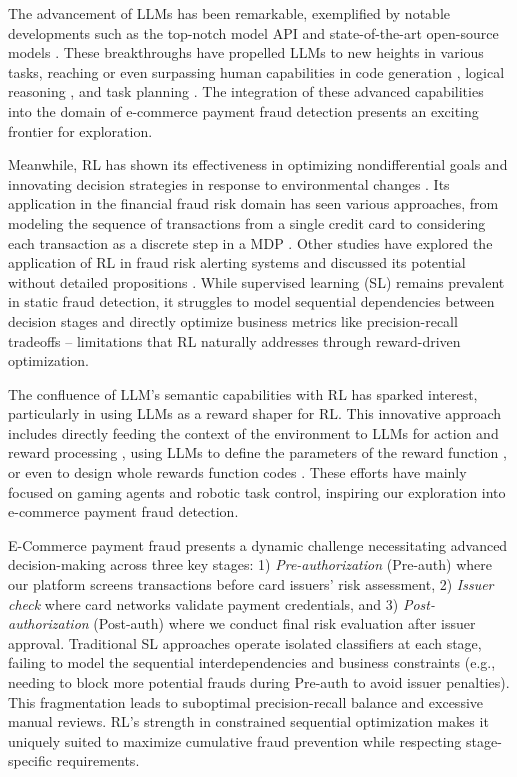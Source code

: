 \documentclass[11pt]{article}
\begin{document}
The advancement of LLMs has been remarkable, exemplified by notable developments such as the top-notch model API \cite{openai2023gpt} and state-of-the-art open-source models \cite{dubey2024llama3herdmodels} \cite{jiang2023mistral} \cite{jiang2024mixtral} \cite{team2024gemma} \cite{guo2024deepseek}. These breakthroughs have propelled LLMs to new heights in various tasks, reaching or even surpassing human capabilities in code generation \cite{chen2021evaluating}, logical reasoning \cite{kojima2022large}, and task planning \cite{shen2024hugginggpt}. The integration of these advanced capabilities into the domain of e-commerce payment fraud detection presents an exciting frontier for exploration.

Meanwhile, RL has shown its effectiveness in optimizing nondifferential goals and innovating decision strategies in response to environmental changes \cite{sutton2018reinforcement} \cite{russell2010artificial}. Its application in the financial fraud risk domain has seen various approaches, from modeling the sequence of transactions from a single credit card to considering each transaction as a discrete step in a MDP \cite{mead2018detecting} \cite{vimal2021application}. Other studies have explored the application of RL in fraud risk alerting systems \cite{shen2020deep} and discussed its potential without detailed propositions \cite{el2017fraud}. While supervised learning (SL) remains prevalent in static fraud detection, it struggles to model sequential dependencies between decision stages and directly optimize business metrics like precision-recall tradeoffs – limitations that RL naturally addresses through reward-driven optimization.

The confluence of LLM’s semantic capabilities with RL has sparked interest, particularly in using LLMs as a reward shaper for RL. This innovative approach includes directly feeding the context of the environment to LLMs for action and reward processing \cite{kwon2023reward}, using LLMs to define the parameters of the reward function \cite{yu2023language}, or even to design whole rewards function codes \cite{ma2023eureka}. These efforts have mainly focused on gaming agents and robotic task control, inspiring our exploration into e-commerce payment fraud detection.

E-Commerce payment fraud presents a dynamic challenge necessitating advanced decision-making across three key stages: 1) \textit{Pre-authorization} (Pre-auth) where our platform screens transactions before card issuers' risk assessment, 2) \textit{Issuer check} where card networks validate payment credentials, and 3) \textit{Post-authorization} (Post-auth) where we conduct final risk evaluation after issuer approval. Traditional SL approaches operate isolated classifiers at each stage, failing to model the sequential interdependencies and business constraints (e.g., needing to block more potential frauds during Pre-auth to avoid issuer penalties). This fragmentation leads to suboptimal precision-recall balance and excessive manual reviews. RL’s strength in constrained sequential optimization makes it uniquely suited to maximize cumulative fraud prevention while respecting stage-specific requirements.
\end{document}
